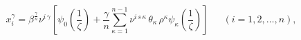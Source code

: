 \begin{equation}
x^{\gamma}_{i}=\beta^{\frac{\gamma}{n}} \nu^{i\,\gamma}\left[
\psi_{0}\left( \frac{1}{\zeta}\right)+ \frac{\gamma}{n}
\sum_{\kappa=1}^{n-1}
\nu^{i\,s\,\kappa}\,\theta_{\kappa}\,\rho^{\kappa}\psi_{\kappa}\left(
\frac{1}{\zeta}\right)\right]\,\,\,\,\,\,\,\,\,(i=1,2,\dots,n),
\end{equation}

